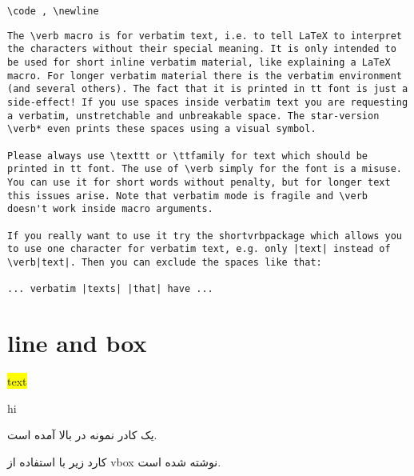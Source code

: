 \documentclass[12pt]{article}
\begin{document}
\begin{latin}
\hlineshort

\verb|\code , \newline |

\hlineshort[5cm]

\begin{Verbatim}[breaklines=true]
The \verb macro is for verbatim text, i.e. to tell LaTeX to interpret the characters without their special meaning. It is only intended to be used for short inline verbatim material, like explaining a LaTeX macro. For longer verbatim material there is the verbatim environment (and several others). The fact that it is printed in tt font is just a side-effect! If you use spaces inside verbatim text you are requesting a verbatim, unstretchable and unbreakable space. The star-version \verb* even prints these spaces using a visual symbol.

Please always use \texttt or \ttfamily for text which should be printed in tt font. The use of \verb simply for the font is a misuse. You can use it for short words without penalty, but for longer text this issues arise. Note that verbatim mode is fragile and \verb doesn't work inside macro arguments.

If you really want to use it try the shortvrbpackage which allows you to use one character for verbatim text, e.g. only |text| instead of  \verb|text|. Then you can exclude the spaces like that:

... verbatim |texts| |that| have ...
\end{Verbatim}
\end{latin}	

\section{line and box}
\hlineshort



\colorbox{yellow}{text}

{\color{red}
}

hi


یک کادر نمونه در بالا آمده است.

کارد زیر با استفاده از vbox نوشته شده است.

\textbox[green]{\vbox{\noindent\ptext[1]}}



\hlinelong
\theend
\end{document}
